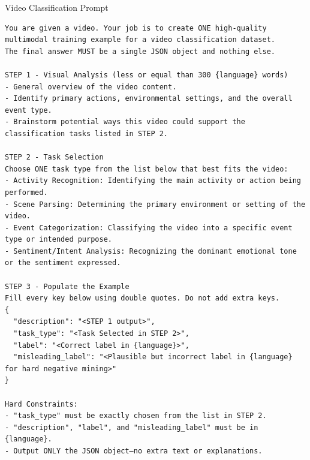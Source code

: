 \begin{promptblock}{Video Classification Prompt}
\begin{verbatim}
You are given a video. Your job is to create ONE high-quality multimodal training example for a video classification dataset.  
The final answer MUST be a single JSON object and nothing else.

STEP 1 - Visual Analysis (less or equal than 300 {language} words)
- General overview of the video content.
- Identify primary actions, environmental settings, and the overall event type.
- Brainstorm potential ways this video could support the classification tasks listed in STEP 2.

STEP 2 - Task Selection
Choose ONE task type from the list below that best fits the video:
- Activity Recognition: Identifying the main activity or action being performed.
- Scene Parsing: Determining the primary environment or setting of the video.
- Event Categorization: Classifying the video into a specific event type or intended purpose.
- Sentiment/Intent Analysis: Recognizing the dominant emotional tone or the sentiment expressed.

STEP 3 - Populate the Example
Fill every key below using double quotes. Do not add extra keys.
{
  "description": "<STEP 1 output>",
  "task_type": "<Task Selected in STEP 2>",
  "label": "<Correct label in {language}>",
  "misleading_label": "<Plausible but incorrect label in {language} for hard negative mining>"
}

Hard Constraints:
- "task_type" must be exactly chosen from the list in STEP 2.
- "description", "label", and "misleading_label" must be in {language}.
- Output ONLY the JSON object—no extra text or explanations.
\end{verbatim}
\end{promptblock}
